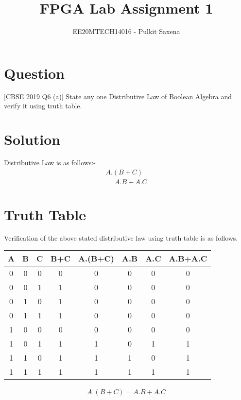 \documentclass[journal,12pt,twocolumn]{IEEEtran}
\title{FPGA Lab Assignment 1}
\author{EE20MTECH14016 - Pulkit Saxena}
\numberwithin{equation}{section}
\begin{document}
\maketitle

\section{Question}

[CBSE 2019 Q6 (a)] State any one Distributive Law of Boolean Algebra and verify it using truth table.

\section{Solution}
Distributive Law is as follows:-
\begin{align}
 A.(B+C) \\
= A.B+A.C
\end{align}

\section{Truth Table}
Verification of the above stated distributive law using truth table is as follows.
\medskip

    \centering
          \begin{tabular}{|c|c|c|c|c|c|c|c|}
            \hline
            A & B & C & B+C & A.(B+C) & A.B & A.C & A.B+A.C \\
            \hline
            0 & 0 & 0 & 0 & 0 & 0 & 0 & 0\\
            \hline
             0 & 0 & 1 & 1 & 0 & 0 & 0 & 0\\
            \hline
             0 & 1 & 0 & 1 & 0 & 0 & 0 & 0\\
            \hline
             0 & 1 & 1 & 1 & 0 & 0 & 0 & 0\\
            \hline
            1 & 0 & 0 & 0 & 0 & 0 & 0 & 0\\
            \hline
            1 & 0 & 1 & 1 & 1 & 0 & 1 & 1\\
            \hline
            1 & 1 & 0 & 1 & 1 & 1 & 0 & 1\\
            \hline
            1 & 1 & 1 & 1 & 1 & 1 & 1 & 1\\
            \hline
            
        \end{tabular}
        \begin{align}
		 A.(B+C) = A.B+A.C
		\end{align}
     
\end{document}
